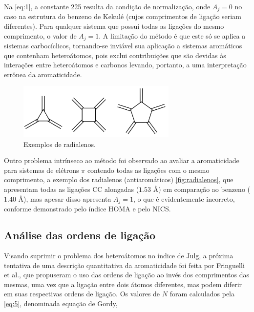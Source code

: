 Na \autoref{eq:1}, a constante 225 resulta da condição de normalização, onde $A_j = 0$ no caso na estrutura do benzeno de Kekulé (cujos comprimentos de ligação seriam diferentes). Para qualquer sistema que possui todas as ligações do mesmo comprimento, o valor de $A_j = 1$. A limitação do método é que este só se aplica a sistemas carbocíclicos, tornando-se inviável sua aplicação a sistemas aromáticos que contenham heteroátomos, pois exclui contribuições que são devidas às interações entre heteroátomos e carbonos levando, portanto, a uma interpretação errônea da aromaticidade.

\begin{figure}[htb]
	\caption{\label{fig:radialenos} Exemplos de radialenos.}
	\begin{center}
		\includegraphics[width=0.70\textwidth]{images/radialenos.png}
	\end{center}
\end{figure}

Outro problema intrínseco ao método foi observado ao avaliar a aromaticidade para sistemas de elétrons $\pi$ contendo todas as ligações com o mesmo comprimento, a exemplo dos radialenos (antiaromáticos) \autoref{fig:radialenos}, que apresentam todas as ligações CC alongadas ($1.53$ \AA) em comparação ao benzeno ($1.40$ \AA), mas apesar disso apresenta $A_j = 1$, o que é evidentemente incorreto, conforme demonstrado pelo índice \gls{HOMA} e pelo NICS.


\subsection{Análise das ordens de ligação}

Visando suprimir o problema dos heteroátomos no índice de Julg, a próxima tentativa de uma descrição quantitativa da aromaticidade foi feita por Fringuelli et al.\autocite{Fringuelli1974}, que propuseram o uso das ordens de ligação ao invés dos comprimentos das mesmas, uma vez que a ligação entre dois átomos diferentes, mas podem diferir em suas respectivas ordens de ligação. Os valores de $N$ foram calculados pela \autoref{eq:5}, denominada equação de Gordy\autocite{Gordy1947},

